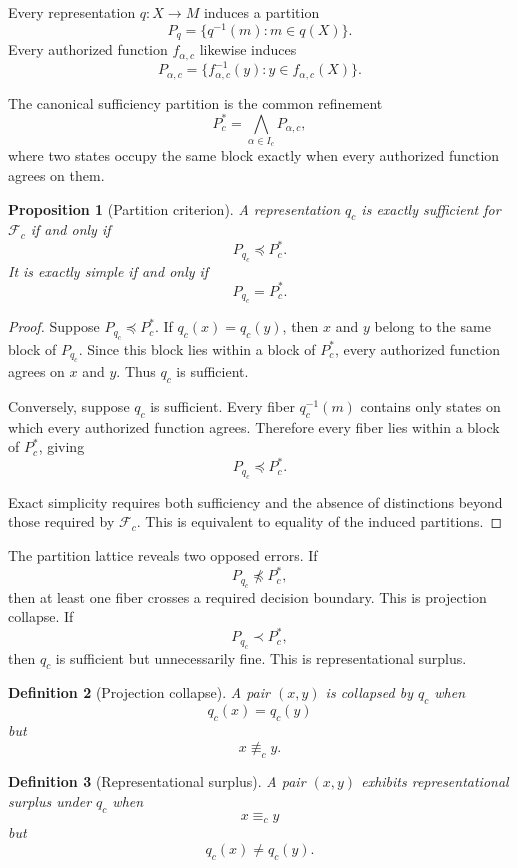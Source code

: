 \documentclass[11pt]{article}
\newtheorem{definition}{Definition}[section]
\newtheorem{proposition}[definition]{Proposition}
\theoremstyle{definition}
\newcommand{\F}{\mathcal{F}}
\begin{document}
Every representation \(q:X\to M\) induces a partition
\[
P_q
=
\{q^{-1}(m):m\in q(X)\}.
\]
Every authorized function \(f_{\alpha,c}\) likewise induces
\[
P_{\alpha,c}
=
\{f_{\alpha,c}^{-1}(y):y\in f_{\alpha,c}(X)\}.
\]

The canonical sufficiency partition is the common refinement
\[
P_c^{*}
=
\bigwedge_{\alpha\in I_c}P_{\alpha,c},
\]
where two states occupy the same block exactly when every authorized function agrees on them.

\begin{proposition}[Partition criterion]
A representation \(q_c\) is exactly sufficient for \(\F_c\) if and only if
\[
P_{q_c}\preceq P_c^{*}.
\]
It is exactly simple if and only if
\[
P_{q_c}=P_c^{*}.
\]
\end{proposition}

\begin{proof}
Suppose \(P_{q_c}\preceq P_c^{*}\). If \(q_c(x)=q_c(y)\), then \(x\) and \(y\) belong to the same block of \(P_{q_c}\). Since this block lies within a block of \(P_c^{*}\), every authorized function agrees on \(x\) and \(y\). Thus \(q_c\) is sufficient.

Conversely, suppose \(q_c\) is sufficient. Every fiber \(q_c^{-1}(m)\) contains only states on which every authorized function agrees. Therefore every fiber lies within a block of \(P_c^{*}\), giving
\[
P_{q_c}\preceq P_c^{*}.
\]

Exact simplicity requires both sufficiency and the absence of distinctions beyond those required by \(\F_c\). This is equivalent to equality of the induced partitions.
\end{proof}

The partition lattice reveals two opposed errors. If
\[
P_{q_c}\not\preceq P_c^{*},
\]
then at least one fiber crosses a required decision boundary. This is projection collapse. If
\[
P_{q_c}\prec P_c^{*},
\]
then \(q_c\) is sufficient but unnecessarily fine. This is representational surplus.

\begin{definition}[Projection collapse]
A pair \((x,y)\) is collapsed by \(q_c\) when
\[
q_c(x)=q_c(y)
\]
but
\[
x\not\equiv_c y.
\]
\end{definition}

\begin{definition}[Representational surplus]
A pair \((x,y)\) exhibits representational surplus under \(q_c\) when
\[
x\equiv_c y
\]
but
\[
q_c(x)\neq q_c(y).
\]
\end{definition}
\end{document}
